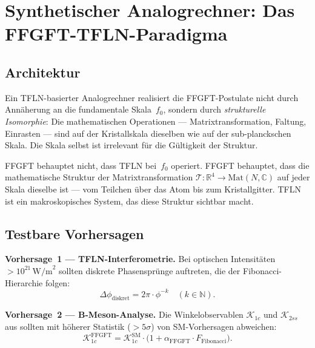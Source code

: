 \section{Synthetischer Analogrechner: Das FFGFT-TFLN-Paradigma}

\subsection{Architektur}

Ein TFLN-basierter Analogrechner realisiert die FFGFT-Postulate nicht
durch Annäherung an die fundamentale Skala~$f_0$, sondern durch
\emph{strukturelle Isomorphie}: Die mathematischen Operationen —
Matrixtransformation, Faltung, Einrasten — sind auf der Kristallskala
dieselben wie auf der sub-planckschen Skala. Die Skala selbst ist
irrelevant für die Gültigkeit der Struktur.

\begin{keybox}
FFGFT behauptet nicht, dass TFLN bei~$f_0$ operiert. FFGFT behauptet,
dass die mathematische Struktur der Matrixtransformation
$\mathcal{T}: \mathbb{R}^4 \to \mathrm{Mat}(N,\mathbb{C})$
auf jeder Skala dieselbe ist — vom Teilchen über das Atom bis
zum Kristallgitter. TFLN ist ein makroskopisches System, das diese
Struktur sichtbar macht.
\end{keybox}

\subsection{Testbare Vorhersagen}

\begin{predbox}
\textbf{Vorhersage~1 — TFLN-Interferometrie.}
Bei optischen Intensitäten $> 10^{21}\,\text{W/m}^2$ sollten diskrete
Phasensprünge auftreten, die der Fibonacci-Hierarchie folgen:
\[
  \Delta\phi_{\text{diskret}} = 2\pi \cdot \phi^{-k} \quad (k \in \mathbb{N}).
\]
\end{predbox}

\begin{predbox}
\textbf{Vorhersage~2 — B-Meson-Analyse.}
Die Winkelobservablen $\mathcal{K}_{1c}$ und $\mathcal{K}_{2ss}$ aus
\cite{Arslan2026} sollten mit höherer Statistik ($> 5\sigma$) von
SM-Vorhersagen abweichen:
\[
  \mathcal{K}_{1c}^{\text{FFGFT}}
  = \mathcal{K}_{1c}^{\text{SM}}
    \cdot \bigl(1 + \alpha_{\text{FFGFT}} \cdot F_{\text{Fibonacci}}\bigr).
\]
\end{predbox}

